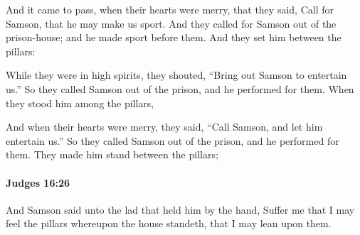 			\begin{versebox}
					\item[BHS] 
					\item[ASV] And it came to pass, when their hearts were merry, that they said, Call for Samson, that he may make us sport. And they called for Samson out of the prison-house; and he made sport before them. And they set him between the pillars:
					\item[NIV] While they were in high spirits, they shouted, “Bring out Samson to entertain us.” So they called Samson out of the prison, and he performed for them. When they stood him among the pillars,
					\item[NRSV] And when their hearts were merry, they said, “Call Samson, and let him entertain us.” So they called Samson out of the prison, and he performed for them. They made him stand between the pillars;
			\end{versebox}

		\paragraph{Judges 16:26} %
			\label{JUDGES-16-26}

			And Samson said unto the lad that held him by the hand, Suffer me that I may feel the pillars whereupon the house standeth, that I may lean upon them.

